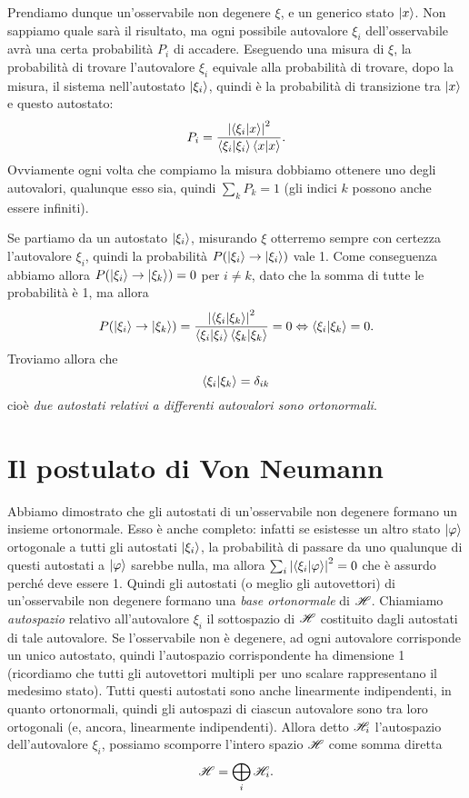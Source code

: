 Prendiamo dunque un'osservabile non degenere $\xi$, e un generico stato $\left|{x}\right\rangle$.
Non sappiamo quale sarà il risultato, ma ogni possibile autovalore $\xi_i$ dell'osservabile avrà una certa probabilità $P_i$ di accadere.
Eseguendo una misura di $\xi$, la probabilità di trovare l'autovalore $\xi_i$ equivale alla probabilità di trovare, dopo la misura, il sistema nell'autostato $\left|{\xi_i}\right\rangle$, quindi è la probabilità di transizione tra $\left|{x}\right\rangle$ e questo autostato:
\begin{equation}
	P_i=\frac{\left|{\left\langle{\xi_i}\middle|{x}\right\rangle}\right|^2}{\left\langle{\xi_i}\middle|{\xi_i}\right\rangle\left\langle{x}\middle|{x}\right\rangle}.
\end{equation}
Ovviamente ogni volta che compiamo la misura dobbiamo ottenere uno degli autovalori, qualunque esso sia, quindi $\sum_kP_k=1$ (gli indici $k$ possono anche essere infiniti).

Se partiamo da un autostato $\left|{\xi_i}\right\rangle$, misurando $\xi$ otterremo sempre con certezza l'autovalore $\xi_i$, quindi la probabilità $P(\left|{\xi_i}\right\rangle\to\left|{\xi_i}\right\rangle)$ vale 1.
Come conseguenza abbiamo allora $P(\left|{\xi_i}\right\rangle\to\left|{\xi_k}\right\rangle)=0$ per $i\neq k$, dato che la somma di tutte le probabilità è 1, ma allora
\begin{equation}
	P(\left|{\xi_i}\right\rangle\to\left|{\xi_k}\right\rangle)=\frac{\left|{\left\langle{\xi_i}\middle|{\xi_k}\right\rangle}\right|^2}{\left\langle{\xi_i}\middle|{\xi_i}\right\rangle\left\langle{\xi_k}\middle|{\xi_k}\right\rangle}=0 \Leftrightarrow \left\langle{\xi_i}\middle|{\xi_k}\right\rangle=0.
	\label{eq:autostati-ortogonali}
\end{equation}
Troviamo allora che
\begin{equation}
	\left\langle{\xi_i}\middle|{\xi_k}\right\rangle=\delta_{ik}
	\label{eq:autostati-ortonormali}
\end{equation}
cioè \emph{due autostati relativi a differenti autovalori sono ortonormali}.

\section{Il postulato di Von Neumann}
Abbiamo dimostrato che gli autostati di un'osservabile non degenere formano un insieme ortonormale.
Esso è anche completo: infatti se esistesse un altro stato $\left|{\varphi}\right\rangle$ ortogonale a tutti gli autostati $\left|{\xi_i}\right\rangle$, la probabilità di passare da uno qualunque di questi autostati a $\left|{\varphi}\right\rangle$ sarebbe nulla, ma allora $\sum_i\left|{\left\langle{\xi_i}\middle|{\varphi}\right\rangle}\right|^2=0$ che è assurdo perch\'e deve essere 1.
Quindi gli autostati (o meglio gli autovettori) di un'osservabile non degenere formano una \emph{base ortonormale} di $\mathscr H$.
Chiamiamo \emph{autospazio} relativo all'autovalore $\xi_i$ il sottospazio di $\mathscr H$ costituito dagli autostati di tale autovalore.
Se l'osservabile non è degenere, ad ogni autovalore corrisponde un unico autostato, quindi l'autospazio corrispondente ha dimensione 1 (ricordiamo che tutti gli autovettori multipli per uno scalare rappresentano il medesimo stato).
Tutti questi autostati sono anche linearmente indipendenti, in quanto ortonormali, quindi gli autospazi di ciascun autovalore sono tra loro ortogonali (e, ancora, linearmente indipendenti).
Allora detto $\mathscr H_i$ l'autospazio dell'autovalore $\xi_i$, possiamo scomporre l'intero spazio $\mathscr H$ come somma diretta
\begin{equation}
	\mathscr H=\bigoplus_i\mathscr H_i.
\end{equation}

